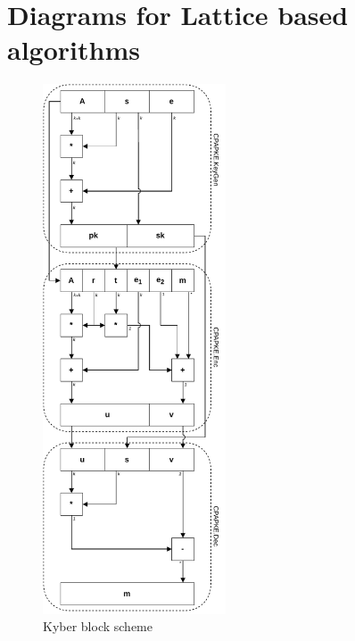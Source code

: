 \chapter{Diagrams for Lattice based algorithms}
\label{ch:block_diagrams}

\begin{figure}[ht!]
  \centering
  \includegraphics[width=0.484\textwidth]{pictures/kyber_all.pdf}
  \caption{Kyber block scheme}
  \label{img:kyber_all}
\end{figure}

